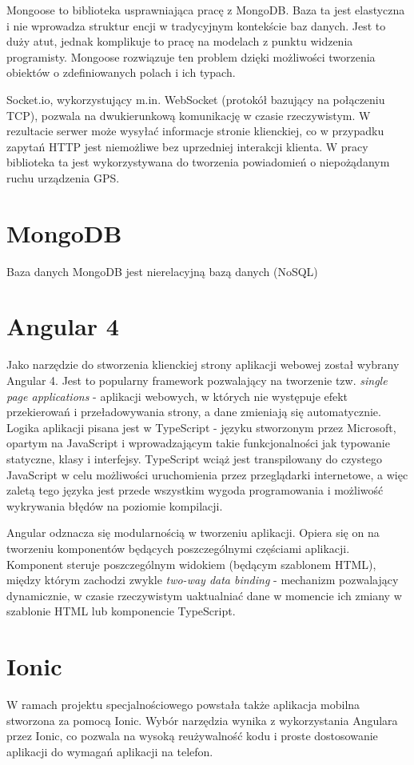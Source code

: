\documentclass[eng,printmode]{mgr}
\begin{document}
Mongoose to biblioteka usprawniająca pracę z MongoDB. Baza ta jest elastyczna i nie wprowadza struktur encji w tradycyjnym kontekście baz danych. Jest to duży atut, jednak komplikuje to pracę na modelach z punktu widzenia programisty. Mongoose rozwiązuje ten problem dzięki możliwości tworzenia obiektów o zdefiniowanych polach i ich typach.

Socket.io, wykorzystujący m.in. WebSocket (protokół bazujący na połączeniu TCP), pozwala na dwukierunkową komunikację w czasie rzeczywistym. W rezultacie serwer może wysyłać informacje stronie klienckiej, co w przypadku zapytań HTTP jest niemożliwe bez uprzedniej interakcji klienta. W pracy biblioteka ta jest wykorzystywana do tworzenia powiadomień o niepożądanym ruchu urządzenia GPS.

\section{MongoDB}
Baza danych MongoDB jest nierelacyjną bazą danych (NoSQL)
\section{Angular 4}
Jako narzędzie do stworzenia klienckiej strony aplikacji webowej został wybrany Angular 4. Jest to popularny framework pozwalający na tworzenie tzw. \textit{single page applications} - aplikacji webowych, w których nie występuje efekt przekierowań i przeładowywania strony, a dane zmieniają się automatycznie. Logika aplikacji pisana jest w TypeScript - języku stworzonym przez Microsoft, opartym na JavaScript i wprowadzającym takie funkcjonalności jak typowanie statyczne, klasy i interfejsy. TypeScript wciąż jest transpilowany do czystego JavaScript w celu możliwości uruchomienia przez przeglądarki internetowe, a więc zaletą tego języka jest przede wszystkim wygoda programowania i możliwość wykrywania błędów na poziomie kompilacji.

Angular odznacza się modularnością w tworzeniu aplikacji. Opiera się on na tworzeniu komponentów będących poszczególnymi częściami aplikacji. Komponent steruje poszczególnym widokiem (będącym szablonem HTML), między którym zachodzi zwykle \textit{two-way data binding} - mechanizm pozwalający dynamicznie, w czasie rzeczywistym uaktualniać dane w momencie ich zmiany w szablonie HTML lub komponencie TypeScript.
\section{Ionic}
W ramach projektu specjalnościowego powstała także aplikacja mobilna stworzona za pomocą Ionic. Wybór narzędzia wynika z wykorzystania Angulara przez Ionic, co pozwala na wysoką reużywalność kodu i proste dostosowanie aplikacji do wymagań aplikacji na telefon.
\end{document}
